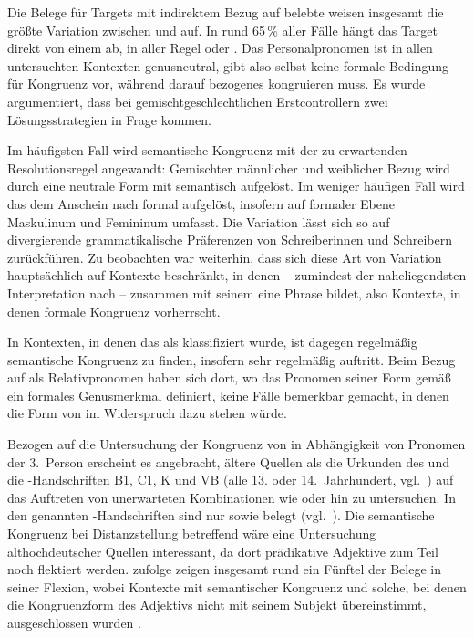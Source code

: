 Die Belege für Targets mit indirektem Bezug auf belebte
 weisen insgesamt die größte Variation zwischen
 und  auf. In rund 65\,\% aller Fälle hängt das Target
direkt von einem  ab, in aller Regel  oder
. Das Personalpronomen ist in allen untersuchten Kontexten
genusneutral, gibt also selbst keine formale Bedingung für
Kongruenz vor, während darauf bezogenes  kongruieren muss. Es wurde
argumentiert, dass bei gemischtgeschlechtlichen
Erstcontrollern zwei Lösungsstrategien in Frage kommen.

Im häufigsten Fall wird semantische Kongruenz mit der
zu erwartenden Resolutionsregel angewandt: Gemischter männlicher und weiblicher
Bezug wird durch eine neutrale Form mit \mbox{} semantisch aufgelöst.
Im weniger häufigen Fall wird das  dem Anschein nach formal
aufgelöst, insofern  auf formaler Ebene Maskulinum und Femininum
umfasst. Die Variation lässt sich so auf divergierende grammatikalische
Präferenzen von Schreiberinnen und Schreibern zurück\-führen. Zu beobachten war
weiterhin, dass sich diese Art von Variation hauptsächlich auf Kontexte
beschränkt, in denen  -- zumindest der naheliegendsten
Interpretation nach -- zusammen mit seinem  eine Phrase
bildet, also Kontexte, in denen formale
Kongruenz vorherrscht.

In Kontexten, in denen das  als 
klassifiziert wurde, ist dagegen regelmäßig semantische
Kongruenz zu finden, insofern sehr regelmäßig
 auftritt. Beim Bezug auf  als
Relativpronomen haben sich dort, wo das Pronomen seiner
Form gemäß ein formales Genusmerkmal definiert, keine Fälle
bemerkbar gemacht, in denen die Form von  im Widerspruch dazu
stehen würde.

Bezogen auf die Untersuchung der Kongruenz von  in Abhängigkeit von
Pro\-nomen der 3.~Person erscheint es angebracht, ältere Quellen
als die Urkunden des \CAO{} und die \KC{}-Handschriften B1, C1, K und VB (alle
13. oder 14.~Jahrhundert, vgl.~) auf das Auftreten von
unerwarteten Kombinationen wie  oder  hin zu
untersuchen. In den genannten \KC{}-Handschriften sind nur 
sowie  belegt (vgl.~). Die
semantische Kongruenz bei Distanz\-stellung
betreffend wäre eine Untersuchung althochdeutscher Quellen
interessant, da dort prädikative
Adjektive zum Teil noch flektiert
werden. \citet[310--311]{fleischer2007} zufolge
zeigen insgesamt rund ein Fünftel der Belege in seiner 
Flexion, wobei Kontexte mit semantischer Kongruenz und solche, bei denen die
Kongruenzform des Adjektivs nicht mit seinem Subjekt
übereinstimmt, ausgeschlossen wurden \autocite[304]{fleischer2007}.

